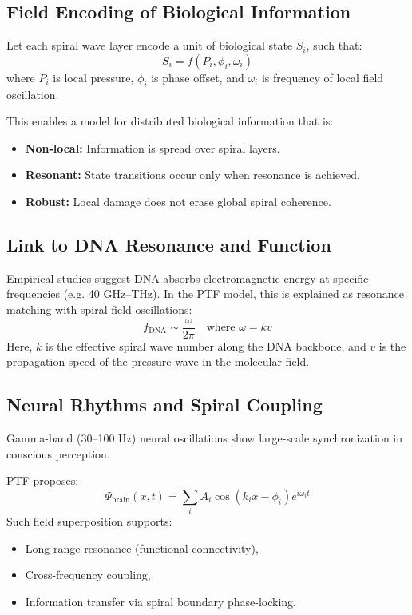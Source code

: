 \documentclass[a4paper,12pt]{article}
\begin{document}
\subsection{Field Encoding of Biological Information}

Let each spiral wave layer encode a unit of biological state \(S_i\), such that:
\[
S_i = f(P_i, \phi_i, \omega_i)
\]
where \(P_i\) is local pressure, \(\phi_i\) is phase offset, and \(\omega_i\) is frequency of local field oscillation.

This enables a model for distributed biological information that is:
\begin{itemize}
    \item \textbf{Non-local:} Information is spread over spiral layers.
    \item \textbf{Resonant:} State transitions occur only when resonance is achieved.
    \item \textbf{Robust:} Local damage does not erase global spiral coherence.
\end{itemize}

\subsection{Link to DNA Resonance and Function}

Empirical studies suggest DNA absorbs electromagnetic energy at specific frequencies (e.g. 40 GHz–THz).  
In the PTF model, this is explained as resonance matching with spiral field oscillations:
\[
f_{\text{DNA}} \sim \frac{\omega}{2\pi} \quad \text{where } \omega = k v
\]
Here, \(k\) is the effective spiral wave number along the DNA backbone, and \(v\) is the propagation speed of the pressure wave in the molecular field.

\subsection{Neural Rhythms and Spiral Coupling}

Gamma-band (30–100 Hz) neural oscillations show large-scale synchronization in conscious perception.

PTF proposes:
\[
\Psi_{\text{brain}}(x,t) = \sum_i A_i \cos(k_i x - \phi_i) e^{i \omega_i t}
\]
Such field superposition supports:
\begin{itemize}
    \item Long-range resonance (functional connectivity),
    \item Cross-frequency coupling,
    \item Information transfer via spiral boundary phase-locking.
\end{itemize}
\end{document}

